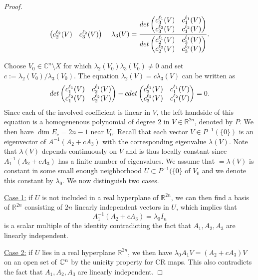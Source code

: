 \documentclass[10pt,a4paper]{amsart}
\newcommand{\C}{\mathbb C}
\newcommand{\R}{\mathbb R}
\numberwithin{equation}{section}
\begin{document}
\begin{proof}
$${\begin{pmatrix}
c_2^{\ell_2}(V) & c_3^{\ell_2}(V)\\ 
\end{pmatrix}} \ \ \ \ \lambda_3(V)=\frac{{\rm det}\begin{pmatrix} 
c_3^{\ell_1}(V) & c_1^{\ell_1}(V)\\
c_3^{\ell_2}(V) & c_1^{\ell_2}(V)\\ 
\end{pmatrix}}{{\rm det}\begin{pmatrix} 
c_2^{\ell_1}(V) & c_3^{\ell_1}(V)\\
c_2^{\ell_2}(V) & c_3^{\ell_2}(V)\\ 
\end{pmatrix}}.$$

Choose   $V_0 \in \C^n \setminus X$ for which    $\lambda_2(V_0)\lambda_3(V_0) \neq 0$ and  set $c:=\lambda_2(V_0)/\lambda_3(V_0)$. %
The equation $\lambda_2(V)= c\lambda_3(V)$ can be written as  
\begin{equation*}
{\rm det}\begin{pmatrix} 
c_1^{\ell_1}(V) & c_2^{\ell_1}(V)\\
c_1^{\ell_2}(V) & c_2^{\ell_2}(V)\\ 
\end{pmatrix}-c{\rm det}\begin{pmatrix} 
c_3^{\ell_1}(V) & c_1^{\ell_1}(V)\\
c_3^{\ell_2}(V) & c_1^{\ell_2}(V)\\ 
\end{pmatrix}=0.
\end{equation*}
Since each of the involved coefficient is linear in $V$, the left handside of this equation is a homogenenous polynomial of degree 2 in $V\in \R^{2n}$, denoted by $P$. We then have  $\dim E_c=2n-1$ near $V_0.$  Recall that each vector  $V\in P^{-1}(\{0\}) $ is an eigenvector of $A^{-1}
(A_2+cA_3)$ with the corresponding eigenvalue $\lambda(V)$. Note that $\lambda(V)$ depends continuously on $V$ and is thus 
locally constant since $A_{1}^{-1}(A_2+cA_3)$ has a finite number of eigenvalues. We  assume that  $=\lambda(V)$ is constant in some
 small enough  neighborhood $U \subset P^{-1}(\{0\}$ of $V_0$ and we denote this constant by $\lambda_0$.   We now distinguish two cases. 

\noindent \underline{Case 1:} if $U$ is not included in a real hyperplane of $\R^{2n}$, we can then find a basis of $\R^{2n}$ consisting of 
$2n$ linearly independent vectors in $U$, which implies that 
$$A_1^{-1}(A_2+cA_3)=\lambda_0 I_n$$ is a scalar multiple of the identity contradicting the fact that $A_1,A_2,A_3$ are linearly independent. 

\noindent \underline{Case 2:} if $U$ lies in a real hyperplane $\R^{2n}$,  we then have $\lambda_0 A_1V=(A_2 + cA_3)V$ on an open set of $\Bbb C^n$ by the unicity property for CR maps. This also contradicts the fact that $A_1,A_2,A_3$ are linearly independent.
\end{proof}
\end{document}
